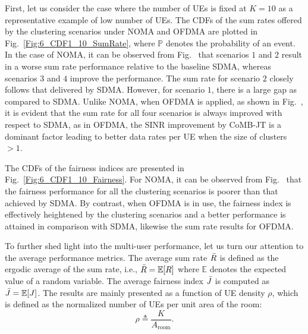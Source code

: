 \documentclass[lettersize,journal]{IEEEtran}
\begin{document}
First, let us consider the case where the number of \acp{UE} is fixed at $K=10$ as a representative example of low number of \acp{UE}. The \acp{CDF} of the sum rates offered by the clustering scenarios under \ac{NOMA} and \ac{OFDMA} are plotted in Fig.~\ref{Fig:6_CDF1_10_SumRate}, where $\mathbb{P}$ denotes the probability of an event. In the case of \ac{NOMA}, it can be observed from Fig.~ that scenarios $1$ and $2$ result in a worse sum rate performance relative to the baseline \ac{SDMA}, whereas scenarios $3$ and $4$ improve the performance. The sum rate for scenario $2$ closely follows that delivered by \ac{SDMA}. However, for scenario $1$, there is a large gap as compared to \ac{SDMA}. Unlike \ac{NOMA}, when \ac{OFDMA} is applied, as shown in Fig.~, it is evident that the sum rate for all four scenarios is always improved with respect to \ac{SDMA}, as in \ac{OFDMA}, the \ac{SINR} improvement by \ac{CoMB}-\ac{JT} is a dominant factor leading to better data rates per \ac{UE} when the size of clusters $>1$.

The \acp{CDF} of the fairness indices are presented in Fig.~\ref{Fig:6_CDF1_10_Fairness}. For \ac{NOMA}, it can be observed from Fig.~ that the fairness performance for all the clustering scenarios is poorer than that achieved by \ac{SDMA}. By contrast, when \ac{OFDMA} is in use, the fairness index is effectively heightened by the clustering scenarios and a better performance is attained in comparison with \ac{SDMA}, likewise the sum rate results for \ac{OFDMA}.

To further shed light into the multi-user performance, let us turn our attention to the average performance metrics. The average sum rate $\Bar{R}$ is defined as the ergodic average of the sum rate, i.e., $\Bar{R}=\mathbb{E}[R]$ where $\mathbb{E}$ denotes the expected value of a random variable. The average fairness index $\Bar{J}$ is computed as $\Bar{J}=\mathbb{E}[J]$. The results are mainly presented as a function of \ac{UE} density $\rho$, which is defined as the normalized number of \acp{UE} per unit area of the room:
\begin{equation}
    \rho \triangleq \frac{K}{A_\mathrm{room}}.
\end{equation}

\end{document}
